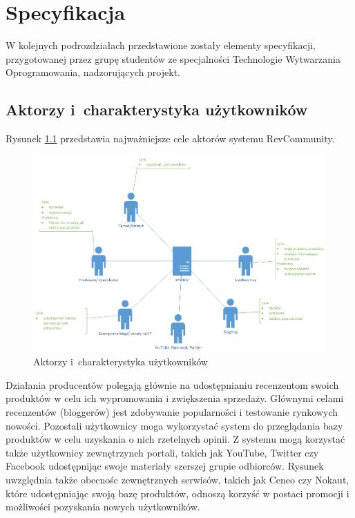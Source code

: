 \chapter{Specyfikacja}

W kolejnych podrozdziałach przedstawione zostały elementy specyfikacji, przygotowanej przez grupę studentów ze specjalności Technologie Wytwarzania Oprogramowania, nadzorujących projekt.

\section{Aktorzy i~charakterystyka użytkowników}

Rysunek \ref{fig:cele} przedstawia najważniejsze cele aktorów systemu RevCommunity.

\begin{figure}[H]
	\centering
	\includegraphics[width=\textwidth, keepaspectratio=true]{images/Strony_cele.png}
	\caption{Aktorzy i~charakterystyka użytkowników}
	\label{fig:cele}
\end{figure}

Działania producentów polegają głównie na udostępnianiu recenzentom swoich produktów w celu ich wypromowania i zwiększenia sprzedaży. Głównymi celami recenzentów (bloggerów) jest zdobywanie popularności i testowanie rynkowych nowości. Pozostali użytkownicy moga wykorzystać system do przeglądania bazy produktów w celu uzyskania o nich rzetelnych opinii. Z systemu mogą korzystać także użytkownicy zewnętrzynch portali, takich jak YouTube, Twitter czy Facebook udostępnijąc swoje materiały szerszej grupie odbiorców. Rysunek uwzględnia także obecnośc zewnętrznych serwisów, takich jak Ceneo czy Nokaut, które udostępniając swoją bazę produktów, odnoszą korzyść w postaci promocji i możliwości pozyskania nowych użytkowników.

